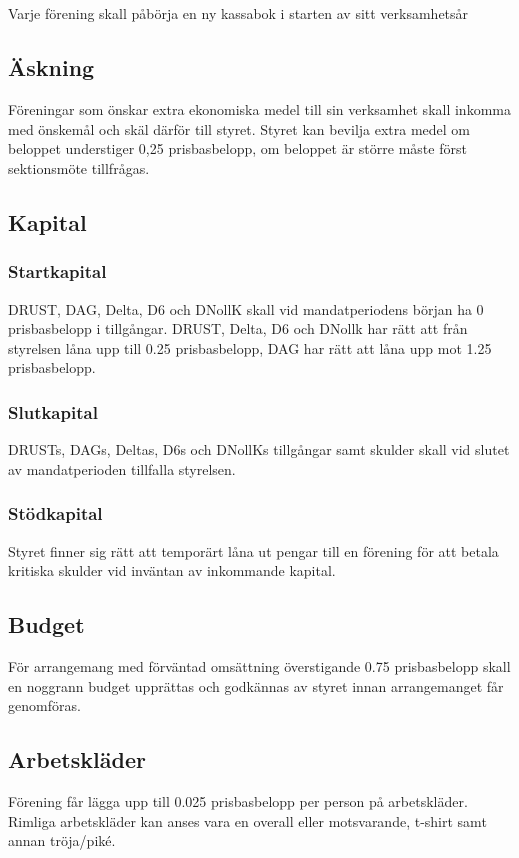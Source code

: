 \documentclass[a4paper, 10pt]{article}
\begin{document}
\subsection{}
Varje förening skall påbörja en ny kassabok i starten av sitt verksamhetsår
\subsection{Äskning}
Föreningar som önskar extra ekonomiska medel till sin verksamhet skall inkomma med önskemål och skäl därför till styret. Styret kan bevilja extra medel om beloppet understiger 0,25 prisbasbelopp, om beloppet är större måste först sektionsmöte tillfrågas.
\subsection{Kapital}
\label{sec:sektionsforeningar_startkapital}
\subsubsection{Startkapital}
DRUST, DAG, Delta, D6 och DNollK skall vid mandatperiodens början ha 0 prisbasbelopp
i tillgångar. DRUST, Delta, D6 och DNollk har rätt att från styrelsen låna
upp till 0.25 prisbasbelopp, DAG har rätt att låna upp mot 1.25 prisbasbelopp.
\subsubsection{Slutkapital}
DRUSTs, DAGs, Deltas, D6s och DNollKs tillgångar samt skulder skall vid slutet av mandatperioden tillfalla styrelsen.
\subsubsection{Stödkapital}
Styret finner sig rätt att temporärt låna ut
pengar till en förening för att betala kritiska skulder vid inväntan av inkommande
kapital.
\subsection{Budget}
För arrangemang med förväntad omsättning överstigande 0.75 prisbasbelopp skall en noggrann budget upprättas och godkännas av styret innan arrangemanget får genomföras.
\subsection{Arbetskläder}
Förening får lägga upp till 0.025 prisbasbelopp per person på arbetskläder. Rimliga arbetskläder kan anses vara en overall eller motsvarande, t-shirt samt annan
tröja/piké.
\end{document}
